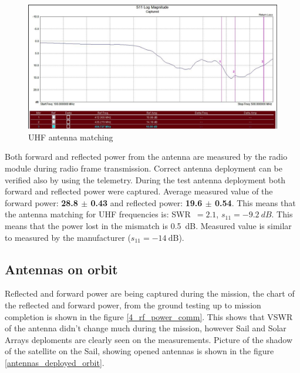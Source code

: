 \begin{figure}[H]
    \centering
    \includegraphics[width=0.8\paperwidth]{img/4/isis_s11_uhf.png}
    \caption{UHF antenna matching}
    \label{isis_s11_uhf}
\end{figure}


Both forward and reflected power from the antenna are measured by the radio module during radio frame transmission. Correct antenna deployment can be verified also by using the telemetry. During the test antenna deployment both forward and reflected power were captured. Average measured value of the forward power: \textbf{\SI{28.8}{\dBm} $\pm$ \SI{0.43}{\dBm}} and reflected power: \textbf{\SI{19.6}{\dBm} $\pm$ \SI{0.54}{\dBm}}. This means that the antenna matching for UHF frequencies is: SWR~$= 2.1$, $s_{11} = -9.2~dB$. This means that the power lost in the mismatch is \SI{0.5}{\dB}. Measured value is similar to measured by the manufacturer ($s_{11} = \SI{-14}{\dB}$).

\subsection{Antennas on orbit}
Reflected and forward power are being captured during the mission, the chart of the reflected and forward power, from the ground testing up to mission completion is shown in the figure \ref{4_rf_power_comm}. This shows that VSWR of the antenna didn't change much during the mission, however Sail and Solar Arrays deploments are clearly seen on the measurements. Picture of the shadow of the satellite on the Sail, showing opened antennas is shown in the figure \ref{antennas_deployed_orbit}.

